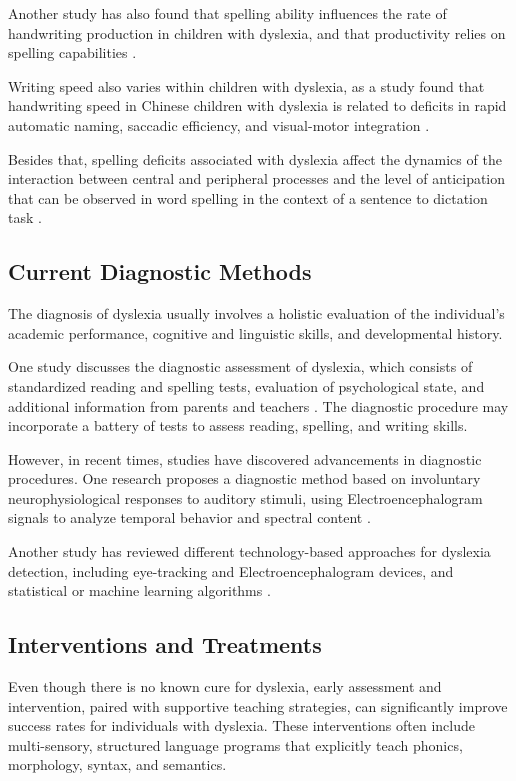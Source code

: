 Another study has also found that spelling ability influences the rate of handwriting production in children with dyslexia, and that productivity relies on spelling capabilities \parencite{Sumner2014}.

Writing speed also varies within children with dyslexia, as a study found that handwriting speed in Chinese children with dyslexia is related to deficits in rapid automatic naming, saccadic efficiency, and visual-motor integration \parencite{ChengLai2013}. 

Besides that, spelling deficits associated with dyslexia affect the dynamics of the interaction between central and peripheral processes and the level of anticipation that can be observed in word spelling in the context of a sentence to dictation task \parencite{SurezCoalla2020}.

\newpage
\subsection{Current Diagnostic Methods}
The diagnosis of dyslexia usually involves a holistic evaluation of the individual's academic performance, cognitive and linguistic skills, and developmental history. 

One study discusses the diagnostic assessment of dyslexia, which consists of standardized reading and spelling tests, evaluation of psychological state, and additional information from parents and teachers \parencite{SchulteKrne2010}. The diagnostic procedure may incorporate a battery of tests to assess reading, spelling, and writing skills. 

However, in recent times, studies have discovered advancements in diagnostic procedures. One research proposes a diagnostic method based on involuntary neurophysiological responses to auditory stimuli, using Electroencephalogram signals to analyze temporal behavior and spectral content \parencite{Ortiz2020}. 

Another study has reviewed different technology-based approaches for dyslexia detection, including eye-tracking and Electroencephalogram devices, and statistical or machine learning algorithms \parencite{Jankovic2022}.

\newpage
\subsection{Interventions and Treatments}
Even though there is no known cure for dyslexia, early assessment and intervention, paired with supportive teaching strategies, can significantly improve success rates for individuals with dyslexia. These interventions often include multi-sensory, structured language programs that explicitly teach phonics, morphology, syntax, and semantics. 

